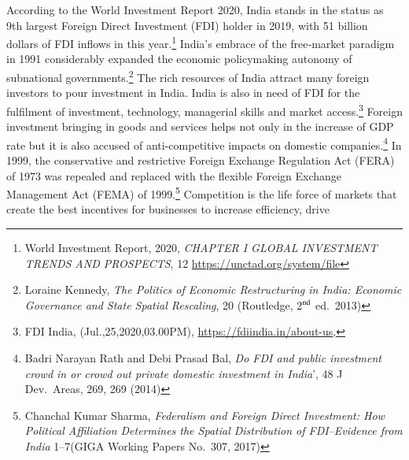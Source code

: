 \setcounter{figure}{0}
\setcounter{table}{0}


\begin{multicols}{2}


\noi
According to the World Investment Report 2020, India stands in the status as 9th largest
Foreign Direct Investment (FDI) holder in 2019, with 51 billion dollars of FDI inflows in this
year.\footnote{World Investment Report, 2020, \textit{CHAPTER I GLOBAL INVESTMENT TRENDS AND PROSPECTS}, 12
\url{https://unctad.org/system/file}} India’s embrace of the free‐market paradigm in 1991 considerably expanded the
economic policymaking autonomy of subnational governments.\footnote{Loraine Kennedy, \textit{The Politics of Economic Restructuring in India: Economic Governance and State Spatial
Rescaling}, 20 (Routledge, 2$^{\rm nd}$ ed.\ 2013)} The rich resources of India
attract many foreign investors to pour investment in India. India is also in need of FDI for the
fulfilment of investment, technology, managerial skills and market access.\footnote{FDI India, (Jul.,25,2020,03.00PM), \url{https://fdiindia.in/about-us},} Foreign
investment bringing in goods and services helps not only in the increase of GDP rate but it is
also accused of anti-competitive impacts on domestic companies.\footnote{Badri Narayan Rath and Debi Prasad Bal, \textit{Do FDI and public investment crowd in or crowd out private
domestic investment in India}’, 48 J Dev.\ Areas, 269, 269 (2014)} In 1999, the conservative
and restrictive Foreign Exchange Regulation Act (FERA) of 1973 was repealed and replaced
with the flexible Foreign Exchange Management Act (FEMA) of 1999.\footnote{Chanchal Kumar Sharma, \textit{Federalism and Foreign Direct Investment: How Political Affiliation Determines the
Spatial Distribution of FDI–Evidence from India} 1--7(GIGA Working Papers No.\ 307, 2017)} Competition is the
life force of markets that create the best incentives for businesses to increase efficiency, drive

\end{multicols}

